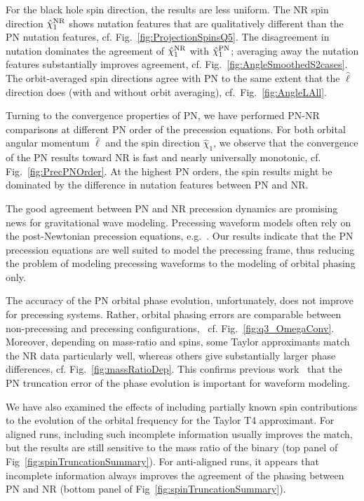 \documentclass[aps,prd,amsmath,floatfix,twocolumn,superscriptaddress,nofootinbib,showpacs]{revtex4-1}
\begin{document}
For the black hole spin direction, the results are less uniform.  The
NR spin direction $\hat\chi_1^{\rm NR}$ shows nutation features that
are qualitatively different than the PN nutation features,
cf. Fig.~\ref{fig:ProjectionSpinsQ5}.  The disagreement in nutation
dominates the agreement of $\hat \chi_1^{\rm NR}$ with
$\hat\chi_1^{\rm PN}$; averaging away the nutation features
substantially improves agreement,
cf. Fig.~\ref{fig:AngleSmoothedS2cases}.  The orbit-averaged
spin directions agree with PN to the same extent that the $\hat\ell$
direction does (with and without orbit averaging),
cf.~Fig.~\ref{fig:AngleLAll}.

Turning to the convergence properties of PN, we have performed PN-NR
comparisons at different PN order of the precession equations.  For
both orbital angular momentum $\hat\ell$ and the spin direction
$\hat\chi_1$, we observe that the convergence of the PN results toward
NR is fast and nearly universally monotonic, cf.
Fig.~\ref{fig:PrecPNOrder}.  At the highest PN orders, the spin
results might be dominated by the difference in nutation features
between PN and NR.

The good agreement between PN and NR precession dynamics are promising
news for gravitational wave modeling.  Precessing waveform models
often rely on the post-Newtonian precession equations,
e.g.~\cite{Arun:2008kb,Hannam:2013oca}.  Our results indicate that the
PN precession equations are well suited to model the precessing frame,
thus reducing the problem of modeling precessing waveforms to the
modeling of orbital phasing only.

The accuracy of the PN orbital phase evolution, unfortunately, does
not improve for precessing systems. Rather, orbital phasing errors are
comparable between non-precessing and precessing configurations, \
cf. Fig.~\ref{fig:q3_OmegaConv}.  Moreover, depending on mass-ratio
and spins, some Taylor approximants match the NR data particularly
well, whereas others give substantially larger phase differences,
cf. Fig.~\ref{fig:massRatioDep}.  This confirms previous
work~\cite{Damour:2010,Hannam:2010,Hannam:2010,Santamaria:2010yb,MacDonald:2012mp,MacDonald:2011ne}
that the PN truncation error of the phase evolution is important for
waveform modeling.

We have also examined the effects of including
partially known spin contributions to the evolution of the orbital
frequency for the Taylor T4 approximant. For aligned runs, including
such incomplete information usually improves the match, but the
results are still sensitive to the mass ratio of the binary (top panel
of Fig~\ref{fig:spinTruncationSummary}). For anti-aligned runs, it
appears that incomplete information always improves the agreement of
the phasing between PN and NR (bottom panel of
Fig~\ref{fig:spinTruncationSummary}).
\end{document}
